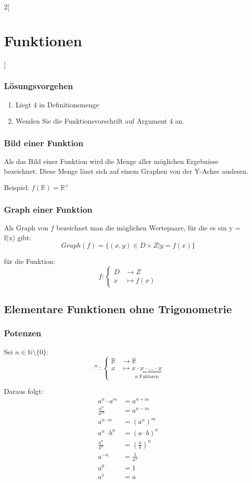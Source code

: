 \begin{multicols}{2}[
	\section{Funktionen}
]
\subsubsection{Lösungsvorgehen}
	\begin{enumerate}
		\item Liegt 4 in Definitionsmenge
		\item Wenden Sie die Funktionsvorschrift auf Argument 4 an.
	\end{enumerate}

\subsubsection{Bild einer Funktion}
	Als das Bild einer Funktion wird die Menge aller möglichen Ergebnisse bezeichnet. Diese Menge lässt sich auf einem Graphen von der Y-Achse auslesen.
	
	Beispiel: $f(\mathbb{R}) = \mathbb{R}^+$
	
\subsubsection{Graph einer Funktion}
	Als Graph von $f$ bezeichnet man die möglichen Wertepaare, für die es ein y = f(x) gibt:
	\[
		Graph(f) = \{(x,y) \in D \times Z | y=f(x)\}
	\]
	
	für die Funktion: 
	\[
		f:
		\begin{cases}
			D &\to Z \\
			x &\mapsto f(x)
		\end{cases}
	\]

\subsection{Elementare Funktionen ohne Trigonometrie}

\subsubsection{Potenzen}
	Sei $n \in \mathbb{N}\setminus\{0\}$:
	\[
		\cdot^n : \begin{cases}
			\mathbb{R} &\to \mathbb{R} \\
			x &\mapsto \underbrace{x \cdot x \cdot \ldots \cdot x}_\text{n Faktoren}
		\end{cases}
	\]
	
	Daraus folgt:
	\begin{align}
		a^n \cdot a^m &= a ^{n+m} \\
		\frac{a^n}{a^m} &= a^{n-m} \\
		a^{n \cdot m} &= (a^n)^m \\
		a^n \cdot b^n &= (a \cdot b)^n \\
		\frac{a^n}{b^n} &= (\frac{a}{b})^n \\
		a^{-n} &= \frac{1}{a^n} \\
		a^0 &= 1 \\
		a^1 &= a
	\end{align}


\end{multicols}
